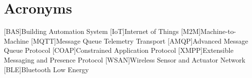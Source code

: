 \chapter{Acronyms}

\footnotesize
\SingleSpacing

\begin{multicols}{2}
\begin{acronym}[AAAAAA]

	[BAS]{Building Automation System}
	[IoT]{Internet of Things}
	[M2M]{Machine-to-Machine}
	[MQTT]{Message Queue Telemetry Transport}
	[AMQP]{Advanced Message Queue Protocol}
	[COAP]{Constrained Application Protocol}
	[XMPP]{Extensible Messaging and Presence Protocol}
	[WSAN]{Wireless Sensor and Actuator Network}
	[BLE]{Bluetooth Low Energy}


\end{acronym}
\end{multicols}

